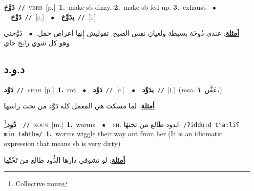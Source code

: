 \documentclass[10pt,a4paper,twoside]{article} %
\begin{document}
\begin{multicols}{2}
{\setlength\topsep{0pt}\textbf{\foreignlanguage{arabic}{دَوَّخ}}\ {\color{gray}\texttt{//}\color{black}}\ \textsc{verb}\ [p.]\ \textbf{1.}~make sb dizzy.  \textbf{2.}~make sb fed up.  \textbf{3.}~exhaust\ \ $\bullet$\ \ \setlength\topsep{0pt}\textbf{\foreignlanguage{arabic}{دَوِّخ}}\ {\color{gray}\texttt{//}\color{black}}\ [c.]\ \ $\bullet$\ \ \setlength\topsep{0pt}\textbf{\foreignlanguage{arabic}{يدَوِّخ}}\ {\color{gray}\texttt{//}\color{black}}\ [i.]\  \begin{flushright}\color{gray}\foreignlanguage{arabic}{\textbf{\underline{\foreignlanguage{arabic}{أمثلة}}}: عندي دُوخَة بسيطة ولعيان نفس الصبح. تقوليش إِنها أعراض حمل.\ $\bullet$\ \  دَوَّخني وهو كل شوي رايح جاي}\end{flushright}\color{black}} \vspace{2mm}

\vspace{-3mm}
\subsection*{\color{blue}\foreignlanguage{arabic}{د.و.د}\color{blue}{}} 

{\setlength\topsep{0pt}\textbf{\foreignlanguage{arabic}{دَوَّد}}\ {\color{gray}\texttt{//}\color{black}}\ \textsc{verb}\ [p.]\ \textbf{1.}~rot\ \ $\bullet$\ \ \setlength\topsep{0pt}\textbf{\foreignlanguage{arabic}{دَوِّد}}\ {\color{gray}\texttt{//}\color{black}}\ [c.]\ \ $\bullet$\ \ \setlength\topsep{0pt}\textbf{\foreignlanguage{arabic}{يدَوِّد}}\ {\color{gray}\texttt{//}\color{black}}\ [i.]\ \color{gray}(msa. \foreignlanguage{arabic}{عَفَّن}~\foreignlanguage{arabic}{\textbf{١.}})\color{black}\  \begin{flushright}\color{gray}\foreignlanguage{arabic}{\textbf{\underline{\foreignlanguage{arabic}{أمثلة}}}: لما مسكت هي المعمل كله دَوَّد من تحت راسها}\end{flushright}\color{black}} \vspace{2mm}

{\setlength\topsep{0pt}\textbf{\foreignlanguage{arabic}{دُود}}\footnote{Collective noun}\ \ {\color{gray}\texttt{//}\color{black}}\ \textsc{noun}\ [m.]\ \textbf{1.}~worms\ \ $\bullet$\ \ \textsc{ph.} \color{gray} \foreignlanguage{arabic}{الدود طَالع من تحتهَا}\color{black}\ {\color{gray}\texttt{/{\sffamily ʔidduːd tˤaːliʕ min taħtha}/}\color{black}}\ \textbf{1.}~worms wiggle their way out from her (It is an idiomatic expression that means sb is very dirty)\  \begin{flushright}\color{gray}\foreignlanguage{arabic}{\textbf{\underline{\foreignlanguage{arabic}{أمثلة}}}: لو تشوفي دارها الدُّود طالع من تَحْتْها}\end{flushright}\color{black}} \vspace{2mm}


\end{multicols}
\end{document}
